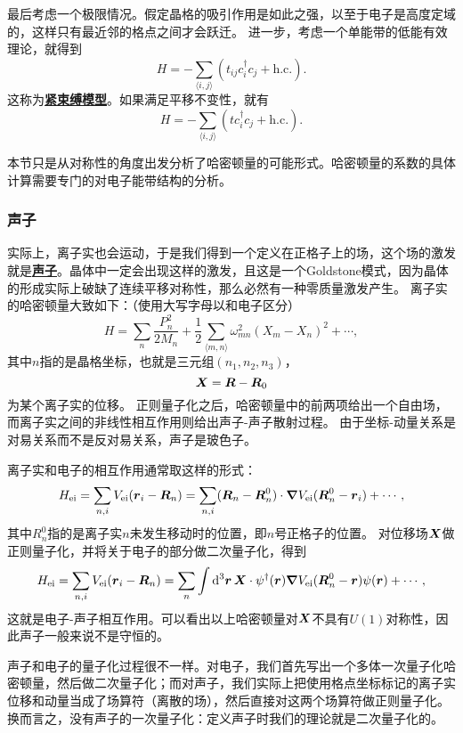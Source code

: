 \documentclass[hyperref, UTF8, a4paper]{ctexart}
\newcommand*{\pair}[1]{\langle #1 \rangle}
\newcommand*{\concept}[1]{\underline{\textbf{#1}}}
\begin{document}
最后考虑一个极限情况。假定晶格的吸引作用是如此之强，以至于电子是高度定域的，这样只有最近邻的格点之间才会跃迁。
进一步，考虑一个单能带的低能有效理论，就得到
\begin{equation}
    {H} = - \sum_{\pair{i, j}} (t_{ij} {c}^\dagger_i {c}_j + \text{h.c.}).
\end{equation}
这称为\concept{紧束缚模型}。如果满足平移不变性，就有
\begin{equation}
    {H} = - \sum_{\pair{i, j}} (t {c}^\dagger_i {c}_j + \text{h.c.}).
\end{equation}

本节只是从对称性的角度出发分析了哈密顿量的可能形式。哈密顿量的系数的具体计算需要专门的对电子能带结构的分析。

\subsubsection{声子}

实际上，离子实也会运动，于是我们得到一个定义在正格子上的场，这个场的激发就是\concept{声子}。晶体中一定会出现这样的激发，且这是一个Goldstone模式，因为晶体的形成实际上破缺了连续平移对称性，那么必然有一种零质量激发产生。
离子实的哈密顿量大致如下：（使用大写字母以和电子区分）
\begin{equation}
    {H} = \sum_n \frac{{P}_n^2}{2M_n} + \frac{1}{2} \sum_{\pair{m, n}} \omega_{mn}^2 ({X}_{m} - {X}_{n})^2 + \cdots, 
\end{equation}
其中$n$指的是晶格坐标，也就是三元组$(n_1, n_2, n_3)$，
\[
    \vb*{X} = \vb*{R} - \vb*{R}_0
\]
为某个离子实的位移。
正则量子化之后，哈密顿量中的前两项给出一个自由场，而离子实之间的非线性相互作用则给出声子-声子散射过程。
由于坐标-动量关系是对易关系而不是反对易关系，声子是玻色子。

离子实和电子的相互作用通常取这样的形式：
\[
    H_\text{ei} = \sum_{n, i} V_\text{ei}(\vb*{r}_i - \vb*{R}_n) = \sum_{n, i} (\vb*{R}_n - \vb*{R}_{n}^0) \cdot \grad{V_\text{ei}}(\vb*{R}_n^0 - \vb*{r}_i) + \cdots,
\]
其中$R^0_n$指的是离子实$n$未发生移动时的位置，即$n$号正格子的位置。
对位移场$\vb*{X}$做正则量子化，并将关于电子的部分做二次量子化，得到
\[
    {H}_{\text{ei}} = \sum_{n, i} V_\text{ei}(\vb*{r}_i - \vb*{R}_n) = \sum_{n} \int \dd[3]{\vb*{r}} {\vb*{X}} \cdot {\psi}^\dagger(\vb*{r}) \grad{V_\text{ei}}(\vb*{R}_n^0 - \vb*{r}) {\psi}(\vb*{r}) + \cdots,
\]
这就是电子-声子相互作用。可以看出以上哈密顿量对${\vb*{X}}$不具有$U(1)$对称性，因此声子一般来说不是守恒的。

声子和电子的量子化过程很不一样。对电子，我们首先写出一个多体一次量子化哈密顿量，然后做二次量子化；而对声子，我们实际上把使用格点坐标标记的离子实位移和动量当成了场算符（离散的场），然后直接对这两个场算符做正则量子化。
换而言之，没有声子的一次量子化：定义声子时我们的理论就是二次量子化的。
\end{document}
